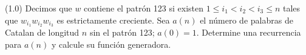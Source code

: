 (1.0) Decimos que $w$ contiene el patrón 123 si existen $1 \le i_1 < i_2 < i_3 \le n$ tales que $w_{i_1} w_{i_2} w_{i_3}$ es estrictamente creciente. Sea $a(n)$ el número de palabras de Catalan de longitud $n$ sin el patrón 123; $a(0)=1$. Determine una recurrencia para $a(n)$ y calcule su función generadora.
